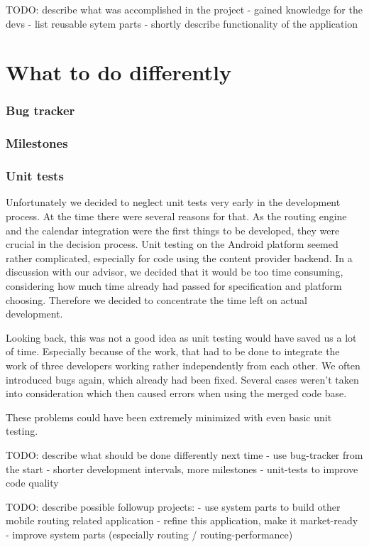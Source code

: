 TODO: describe what was accomplished in the project
- gained knowledge for the devs
- list reusable sytem parts
- shortly describe functionality of the application

\section{What to do differently} %
\label{sec:Whattododifferently}
\subsubsection{Bug tracker} %
\label{ssub:Bugtracker}


\subsubsection{Milestones} %
\label{ssub:Milestones}

\subsubsection{Unit tests} %
\label{ssub:Unittests}
Unfortunately we decided to neglect unit tests very early in the
development process. At the time there were several reasons for that.
As the routing engine and the calendar integration were the first
things to be developed, they were crucial in the decision process.
Unit testing on the Android platform seemed rather complicated,
especially for code using the content provider backend. In a discussion
with our advisor, we decided that it would be too time consuming,
considering how much time already had passed for specification and
platform choosing. Therefore we decided to concentrate the time left
on actual development.

Looking back, this was not a good idea as unit testing would have
saved us a lot of time. Especially because of the work, that had to be
done to integrate the work of three developers working rather
independently from each other. We often introduced bugs again, which
already had been fixed. Several cases weren't taken into consideration
which then caused errors when using the merged code base.

These problems could have been extremely minimized with even basic
unit testing.


TODO: describe what should be done differently next time
- use bug-tracker from the start
- shorter development intervals, more milestones
- unit-tests to improve code quality

TODO: describe possible followup projects:
- use system parts to build other mobile routing related application
- refine this application, make it market-ready
- improve system parts (especially routing / routing-performance)
